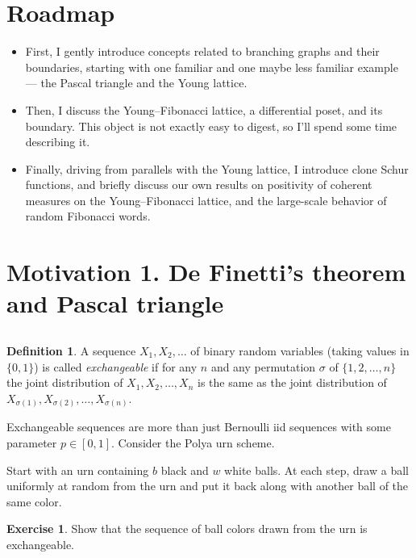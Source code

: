 \documentclass[letterpaper,11pt,oneside,reqno]{article}
\numberwithin{equation}{section}
\theoremstyle{definition}
\newtheorem{definition}[proposition]{Definition}
\newtheorem{exercise}[proposition]{Exercise}
\begin{document}
\section{Roadmap}
\begin{itemize}
\item First, I gently introduce concepts related to branching graphs and their boundaries,
starting with one familiar and one maybe less familiar example ---
the Pascal triangle and the Young lattice.

\item Then, I discuss the Young--Fibonacci lattice, a differential poset, and its boundary. This object
is not exactly easy to digest, so I'll spend some time describing it.

\item Finally, driving from parallels with the Young lattice, I introduce clone Schur functions,
and briefly discuss our own results on positivity of coherent measures on the Young--Fibonacci lattice,
and the large-scale behavior of random Fibonacci words.
\end{itemize}

\section{Motivation 1. De Finetti's theorem and Pascal triangle}

\subsection{}

\begin{definition}
	A sequence $X_1,X_2,\ldots $
	of binary random variables
	(taking values in $\{0,1\}$)
	is called \emph{exchangeable}
	if for any $n$ and any permutation $\sigma$ of $\{1,2,\ldots,n\}$ the joint distribution of $X_1,X_2,\ldots,X_n$ is the same as the joint distribution of $X_{\sigma(1)},X_{\sigma(2)},\ldots,X_{\sigma(n)}$.
\end{definition}

Exchangeable sequences are more than just Bernoulli iid sequences with some
parameter $p\in[0,1]$. Consider the Polya urn scheme.

Start with an urn containing $b$ black and $w$ white balls.
At each step, draw a ball uniformly at random from the urn
and put it back along with another ball of the same color.

\begin{exercise}
	Show that the sequence of ball colors drawn from the urn is exchangeable.
\end{exercise}
\end{document}
